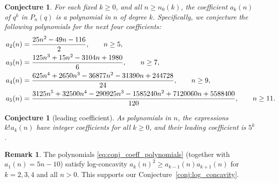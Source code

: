 \documentclass[10pt,a4paper]{amsart}
\numberwithin{equation}{section}
\newcommand{\ssp}{\hspace{1pt}}
\newtheorem{Conjecture}[Theorem]{Conjecture}
\theoremstyle{definition}
\newtheorem{Remark}[Theorem]{Remark}
\begin{document}
\begin{Conjecture}
	\label{conj:coeff_polynomials} For each fixed $k \geq 0$, and all
	$n\ge n_0(k)$, the coefficient $a_k(n)$ of $q^k$ in $P_n(q)$ is a polynomial
	in $n$ of degree $k$.
	Specifically, we conjecture the following polynomials for the next four
	coefficients:
	\begin{gather}
		\label{eq:conj_coeff_polynomials}
		\begin{split}
			&a_2(n)=\frac{25n^2 - 49n - 116}{2},\qquad n \geq 5,\\
			&a_3(n)=\frac{125n^3 + 15n^2 - 3104n + 1980}{6},\qquad  n \geq 7,\\
			&a_4(n)=\frac{625 n^4 + 2650 n^3 - 36877 n^2 - 31390 n + 244728}{24},\qquad  n \geq 9,\\
			&a_5(n)=\frac{3125 n^5 + 32500 n^4 - 290925 n^3 - 1585240 n^2 +
			7120060 n + 5588400}{120},\qquad  n \geq 11.
		\end{split}\hspace{-10mm}
	\end{gather}
\end{Conjecture}

\begin{Conjecture}[leading coefficient]
	\label{conj:leading_coefficient} As polynomials in $n$, the expressions
	$k!\ssp a_k(n)$ have integer coefficients for all $k \geq 0$, and their
	leading coefficient is $5^k$.
\end{Conjecture}
\begin{Remark}
	\label{rmk:log_concavity} The polynomials \eqref{eq:conj_coeff_polynomials}
	(together with $a_1(n)=5n-10$) satisfy log-concavity
	$a_k(n)^2 \ge a_{k-1}(n) a_{k+1}(n)$ for $k=2,3,4$ and all $n>0$.
	This supports our Conjecture~\ref{conj:log_concavity}.
\end{Remark}
\end{document}
